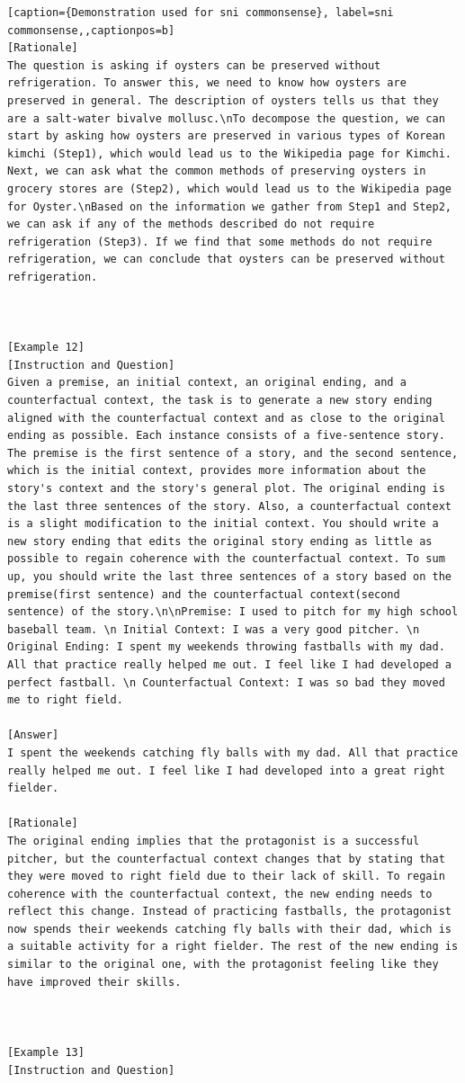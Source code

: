 \begin{lstlisting}[caption={Demonstration used for sni commonsense}, label=sni commonsense,,captionpos=b]
[Rationale]
The question is asking if oysters can be preserved without refrigeration. To answer this, we need to know how oysters are preserved in general. The description of oysters tells us that they are a salt-water bivalve mollusc.\nTo decompose the question, we can start by asking how oysters are preserved in various types of Korean kimchi (Step1), which would lead us to the Wikipedia page for Kimchi. Next, we can ask what the common methods of preserving oysters in grocery stores are (Step2), which would lead us to the Wikipedia page for Oyster.\nBased on the information we gather from Step1 and Step2, we can ask if any of the methods described do not require refrigeration (Step3). If we find that some methods do not require refrigeration, we can conclude that oysters can be preserved without refrigeration.



[Example 12]
[Instruction and Question]
Given a premise, an initial context, an original ending, and a counterfactual context, the task is to generate a new story ending aligned with the counterfactual context and as close to the original ending as possible. Each instance consists of a five-sentence story. The premise is the first sentence of a story, and the second sentence, which is the initial context, provides more information about the story's context and the story's general plot. The original ending is the last three sentences of the story. Also, a counterfactual context is a slight modification to the initial context. You should write a new story ending that edits the original story ending as little as possible to regain coherence with the counterfactual context. To sum up, you should write the last three sentences of a story based on the premise(first sentence) and the counterfactual context(second sentence) of the story.\n\nPremise: I used to pitch for my high school baseball team. \n Initial Context: I was a very good pitcher. \n Original Ending: I spent my weekends throwing fastballs with my dad. All that practice really helped me out. I feel like I had developed a perfect fastball. \n Counterfactual Context: I was so bad they moved me to right field.

[Answer]
I spent the weekends catching fly balls with my dad. All that practice really helped me out. I feel like I had developed into a great right fielder.

[Rationale]
The original ending implies that the protagonist is a successful pitcher, but the counterfactual context changes that by stating that they were moved to right field due to their lack of skill. To regain coherence with the counterfactual context, the new ending needs to reflect this change. Instead of practicing fastballs, the protagonist now spends their weekends catching fly balls with their dad, which is a suitable activity for a right fielder. The rest of the new ending is similar to the original one, with the protagonist feeling like they have improved their skills.



[Example 13]
[Instruction and Question]

    \end{lstlisting}
